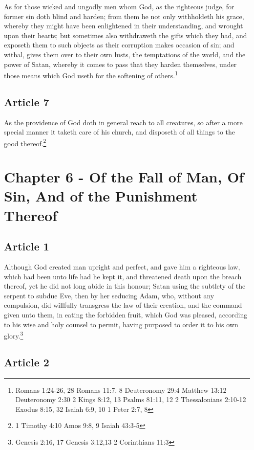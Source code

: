 \documentclass[12pt,letterpaper]{book}
\begin{document}
As for those wicked and ungodly men whom God, as the righteous judge, for former sin doth blind and harden; from them he not only withholdeth his grace, whereby they might have been enlightened in their understanding, and wrought upon their hearts; but sometimes also withdraweth the gifts which they had, and exposeth them to such objects as their corruption makes occasion of sin; and withal, gives them over to their own lusts, the temptations of the world, and the power of Satan, whereby it comes to pass that they harden themselves, under those means which God useth for the softening of others.\footnote{Romans 1:24-26, 28 Romans 11:7, 8 Deuteronomy 29:4 Matthew 13:12 Deuteronomy 2:30 2 Kings 8:12, 13 Psalms 81:11, 12 2 Thessalonians 2:10-12 Exodus 8:15, 32 Isaiah 6:9, 10 1 Peter 2:7, 8}

\section{Article 7}

As the providence of God doth in general reach to all creatures, so after a more special manner it taketh care of his church, and disposeth of all things to the good thereof.\footnote{1 Timothy 4:10 Amos 9:8, 9 Isaiah 43:3-5}

\chapter{Chapter 6 - Of the Fall of Man, Of Sin, And of the Punishment Thereof}
\section{Article 1}

Although God created man upright and perfect, and gave him a righteous law, which had been unto life had he kept it, and threatened death upon the breach thereof, yet he did not long abide in this honour; Satan using the subtlety of the serpent to subdue Eve, then by her seducing Adam, who, without any compulsion, did willfully transgress the law of their creation, and the command given unto them, in eating the forbidden fruit, which God was pleased, according to his wise and holy counsel to permit, having purposed to order it to his own glory.\footnote{Genesis 2:16, 17 Genesis 3:12,13 2 Corinthians 11:3}

\section{Article 2}
\end{document}
